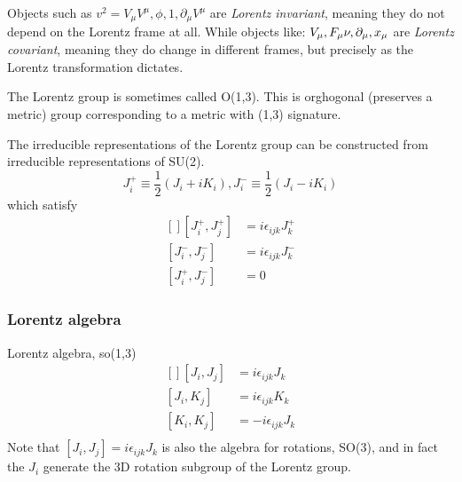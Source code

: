 Objects such as $v^2 = V_\mu V^\mu, \phi, 1, \partial_\mu V^\mu$ are
\emph{Lorentz invariant}, meaning they do not depend on the Lorentz frame at
all. While objects like: $V_\mu, F_\mu\nu, \partial_\mu, x_\mu$ are
\emph{Lorentz covariant}, meaning they do change in different frames, but
precisely as the Lorentz transformation dictates.

The Lorentz group is sometimes called O(1,3). This is orghogonal (preserves
a metric) group corresponding to a metric with (1,3) signature.

The irreducible representations of the Lorentz group can be constructed from
irreducible representations of SU(2). 
\[
    J^+_i \equiv \frac{1}{2}(J_i + iK_i), 
    J^-_i \equiv \frac{1}{2}(J_i - iK_i)
\]
which satisfy
\[
    \begin{aligned}[]
	[J^+_i, J^+_j] &= i\epsilon_{ijk}J^+_k    \\
	[J^-_i, J^-_j] &= i\epsilon_{ijk}J^-_k    \\
	[J^+_i, J^-_j] &= 0 
    \end{aligned}
\]

\subsubsection{Lorentz algebra}
Lorentz algebra, so(1,3)
\[
    \begin{aligned}[]
	[J_i, J_j] &= i\epsilon_{ijk}J_k    \\
	[J_i, K_j] &= i\epsilon_{ijk}K_k    \\
	[K_i, K_j] &= -i\epsilon_{ijk}J_k    \\
    \end{aligned}
\]
Note that $ [J_i, J_j] = i\epsilon_{ijk}J_k $ is also the algebra for
rotations, SO(3), and in fact the $J_i$ generate the 3D rotation subgroup of
the Lorentz group.

